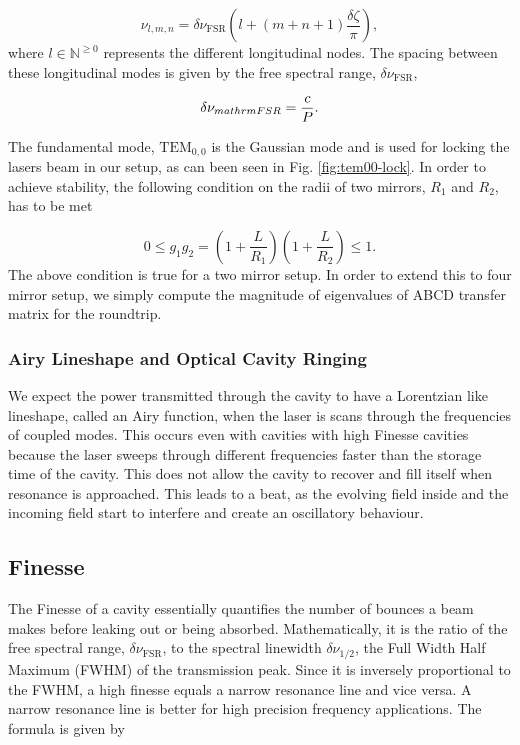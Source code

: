 \documentclass[a4paper]{report}
\numberwithin{equation}{section}
\begin{document}
\begin{equation}
		\nu_{l, m, n} = \delta \nu_{\mathrm{FSR}}  \left(l + \left( m + n + 1 \right) \frac{\delta \zeta}{\pi  }\right) ,
\end{equation}
where $l \in \mathbb{N}^{\ge 0}$ represents the different longitudinal nodes. The spacing between these longitudinal modes is given by the free spectral range, $\delta \nu_{\mathrm{FSR}}$,

\begin{equation}
	\delta\nu_{\\mathrm{FSR}} = \frac{c}{P} .
	\label{eq:fsr}
\end{equation}

The fundamental mode, $\mathrm{TEM}_{0, 0}$ is the Gaussian mode and is used for locking the lasers beam in our setup, as can been seen in Fig. \ref{fig:tem00-lock}. In order to achieve stability, the following condition on the radii of two mirrors, $R_{1}$ and $R_{2}$, has to be met

\begin{equation}
		0 \leq g_{1}g_{2} = \left(1 + \frac{L}{R_{1}} \right)\left(1 + \frac{L}{R_{2}} \right) \leq 1.
\end{equation}
The above condition is true for a two mirror setup. In order to extend this to four mirror setup, we simply compute the magnitude of eigenvalues of ABCD transfer matrix for the roundtrip. 

\subsubsection{Airy Lineshape and Optical Cavity Ringing}
We expect the power transmitted through the cavity to have a Lorentzian like lineshape, called an Airy function, when the laser is scans through the frequencies of coupled modes. This occurs even with cavities with high Finesse cavities because the laser sweeps through different frequencies faster than the storage time of the cavity. This does not allow the cavity to recover and fill itself when resonance is approached. This leads to a beat, as the evolving field inside and the incoming field start to interfere and create an oscillatory behaviour. 

\subsection{Finesse} \label{sec:finesse}
The Finesse of a cavity essentially quantifies the number of bounces a beam makes before leaking out or being absorbed. Mathematically, it is the ratio of the free spectral range, $\delta \nu_{\mathrm{FSR}}$, to the spectral linewidth $\delta \nu_{1/2}$, the Full Width Half Maximum (FWHM) of the transmission peak. Since it is inversely proportional to the FWHM, a high finesse equals a narrow resonance line and vice versa. A narrow resonance line is better for high precision frequency applications. The formula is given by
\end{document}

